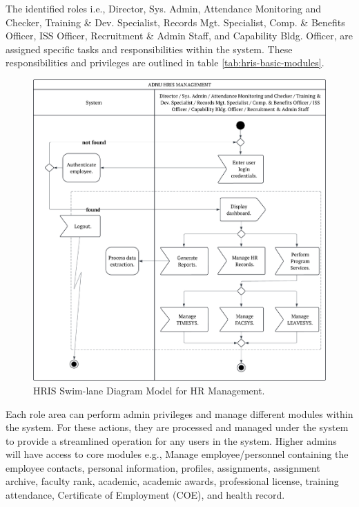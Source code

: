     The identified roles i.e., Director, Sys. Admin, Attendance Monitoring and Checker, Training \& Dev. Specialist, Records Mgt. Specialist, Comp. \& Benefits Officer, ISS Officer, Recruitment \& Admin Staff, and Capability Bldg. Officer, are assigned specific tasks and responsibilities within the system. These responsibilities and privileges are outlined in table \ref*{tab:hris-basic-modules}. 

    \begin{figure}[H]
        \centering
        \includegraphics[width=1\linewidth]{figures/images/diagrams/swimlane/swimlane-admins.png}
        \caption{HRIS Swim-lane Diagram Model for HR Management.}
        \label{fig:swimlane-admins}
    \end{figure}

    Each role area can perform admin privileges and manage different modules within the system. For these actions, they are processed and managed under the system to provide a streamlined operation for any users in the system. Higher admins will have access to core modules e.g., Manage employee/personnel containing the employee contacts, personal information, profiles, assignments, assignment archive, faculty rank, academic, academic awards, professional license, training attendance, Certificate of Employment (COE), and health record.

